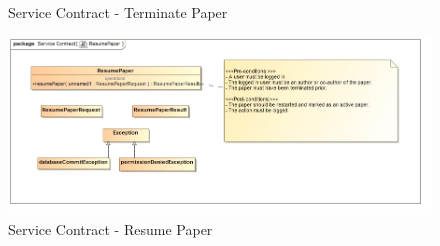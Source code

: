 \documentclass{article}
\begin{document}
\begin{itemize}
\begin{itemize}
\begin{figure}[H]
							\caption{Service Contract - Terminate Paper}
						\end{figure}
						\begin{figure}[H]
							\includegraphics[width=\linewidth]{../Diagrams/ServiceContracts/Publication subsystem/ResumePaper.jpg}
							\caption{Service Contract - Resume Paper}
						\end{figure}
					\end{itemize}
					

\end{itemize}
\end{document}
